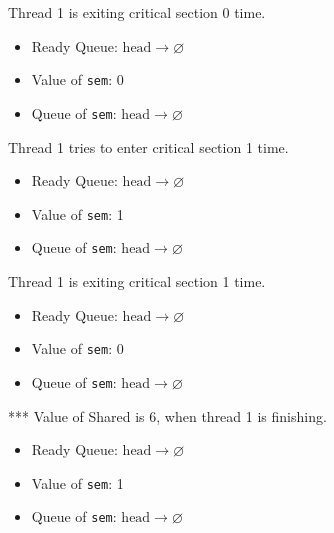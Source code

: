 \documentclass[11pt]{article}
\begin{document}
\begin{question}
    \begin{subquestion}
        Thread 1 is exiting critical section 0 time.

    \begin{itemize}
        \item{
            Ready Queue: $\text{head}\longrightarrow\varnothing$
        } \item{
            Value of {\tt sem}: 0
        } \item{
            Queue of {\tt sem}: $\text{head}\longrightarrow\varnothing$
        }
    \end{itemize}
    \end{subquestion}

    \begin{subquestion}
        Thread 1 tries to enter critical section 1 time.

    \begin{itemize}
        \item{
            Ready Queue: $\text{head}\longrightarrow\varnothing$
        } \item{
            Value of {\tt sem}: 1
        } \item{
            Queue of {\tt sem}: $\text{head}\longrightarrow\varnothing$
        }
    \end{itemize}
    \end{subquestion}

    \begin{subquestion}
        Thread 1 is exiting critical section 1 time.

    \begin{itemize}
        \item{
            Ready Queue: $\text{head}\longrightarrow\varnothing$
        } \item{
            Value of {\tt sem}: 0
        } \item{
            Queue of {\tt sem}: $\text{head}\longrightarrow\varnothing$
        }
    \end{itemize}
    \end{subquestion}

    \begin{subquestion}
        *** Value of Shared is 6, when thread 1 is finishing.

    \begin{itemize}
        \item{
            Ready Queue: $\text{head}\longrightarrow\varnothing$
        } \item{
            Value of {\tt sem}: 1
        } \item{
            Queue of {\tt sem}: $\text{head}\longrightarrow\varnothing$
        }
    \end{itemize}
    \end{subquestion}

\end{question}
\end{document}
